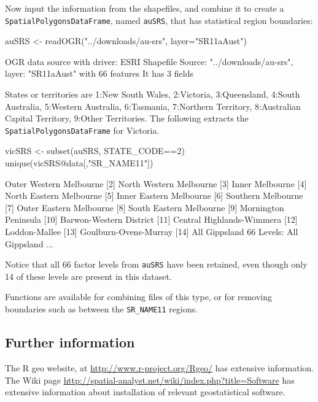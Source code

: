 \documentclass{tufte-book}\usepackage[]{graphicx}\usepackage[]{color}
\newcommand{\txtt}[1]{\texttt{#1}}
\begin{document}
{Now input the information from the shapefiles, and combine
it to create a \txtt{SpatialPolygonsDataFrame}, named \txtt{auSRS},
that has statistical region boundaries:
\begin{Schunk}
\begin{Sinput}
auSRS <- readOGR("../downloads/au-srs", layer="SR11aAust")
\end{Sinput}
\begin{Soutput}
OGR data source with driver: ESRI Shapefile 
Source: "../downloads/au-srs", layer: "SR11aAust"
with 66 features
It has 3 fields
\end{Soutput}
\end{Schunk}
States or territories are 1:New South Wales, 2:Victoria, 3:Queensland,
4:South Australia, 5:Western Australia, 6:Tasmania, 7:Northern Territory,
8:Australian Capital Territory, 9:Other Territories.
The following extracts the \txtt{SpatialPolygonsDataFrame} for Victoria.
\begin{Schunk}
\begin{Sinput}
vicSRS <- subset(auSRS, STATE_CODE==2)
unique(vicSRS@data[,"SR_NAME11"])
\end{Sinput}
\begin{Soutput}
 [1] Outer Western Melbourne  
 [2] North Western Melbourne  
 [3] Inner Melbourne          
 [4] North Eastern Melbourne  
 [5] Inner Eastern Melbourne  
 [6] Southern Melbourne       
 [7] Outer Eastern Melbourne  
 [8] South Eastern Melbourne  
 [9] Mornington Peninsula     
[10] Barwon-Western District  
[11] Central Highlands-Wimmera
[12] Loddon-Mallee            
[13] Goulburn-Ovens-Murray    
[14] All Gippsland            
66 Levels: All Gippsland ...
\end{Soutput}
\end{Schunk}
\noindent
Notice that all 66 factor levels from \txtt{auSRS} have been retained,
even though only 14 of these levels are present in this dataset.

Functions are available for combining files of this type, or for
removing boundaries such as between the \txtt{SR\_NAME11} regions.

\subsection*{Further information}
The R geo website, at \url{http://www.r-project.org/Rgeo/} has extensive
information.  The Wiki page
\url{http://spatial-analyst.net/wiki/index.php?title=Software} has
extensive information about installation of relevant geostatistical
software.

}
\end{document}
